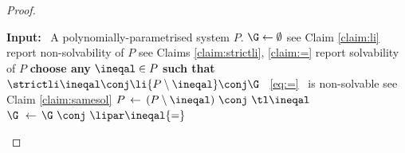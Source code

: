 \begin{proof}
\begin{algorithm}[H]
\caption{(\allpolyineqsolvname)}%
\label{alg:1}
\begin{algorithmic}[1]
\State \textbf{Input:} \ A polynomially-parametrised system $P$.
\smallskip
\State $\G \gets \emptyset$
\Repeat
\smallskip
{} \label{c:if1}
\Comment see Claim \ref{claim:li}
\State report non-solvability of $P$
\Else
{}
\label{c:if2}
\Comment see Claims \ref{claim:strictli}, \ref{claim:=}
\State report solvability of $P$
\Else
\State \textbf{choose any} $\ineqal \in P$ \textbf{such that} \ $\strictli \ineqal \conj \li {P\setminus \ineqal} \conj \G$ \ \eqref{eq:=} \ is non-solvable \label{l:lastif}
\Comment see Claim \ref{claim:samesol}
\smallskip
\State $P \, \gets \, (P \setminus \ineqal) \ \conj \ \tl \ineqal$
\State $\G \,\, \gets \, \G \ \conj \ \lipar \ineqal {=}$
\EndIf 
\EndIf
{}
\end{algorithmic}
\end{algorithm}                                                                                                                                                                  




\end{proof}
